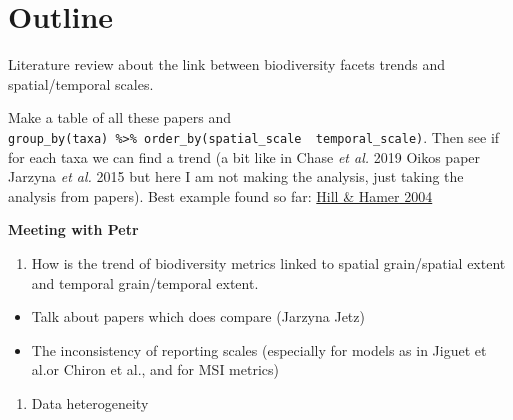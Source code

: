 \documentclass[
  12pt,
  oneside]{report}
\author{François Leroy, PhD student at CZU}
\date{2021-09-14}
\providecommand{\tightlist}{%
  \setlength{\itemsep}{0pt}\setlength{\parskip}{0pt}}
\begin{document}


\cleardoublepage 
{}

{
\hypersetup{linkcolor=}
\setcounter{tocdepth}{1}
\tableofcontents
\newpage
}
\vspace{50mm}


\cleardoublepage 
{}


\hypertarget{outline}{%
\chapter*{Outline}\label{outline}}

Literature review about the link between biodiversity facets trends and spatial/temporal scales.

Make a table of all these papers and \texttt{group\_by(taxa)\ \%\textgreater{}\%\ order\_by(spatial\_scale\ \textbar{}\ temporal\_scale)}. Then see if for each taxa we can find a trend (a bit like in Chase \emph{et al.} 2019 Oikos paper \textbar{} Jarzyna \emph{et al.} 2015 but here I am not making the analysis, just taking the analysis from papers). Best example found so far: \href{https://besjournals.onlinelibrary.wiley.com/doi/10.1111/j.0021-8901.2004.00926.x}{Hill \& Hamer 2004}

\textbf{Meeting with Petr}

\begin{enumerate}
\def\labelenumi{\arabic{enumi})}
\tightlist
\item
  How is the trend of biodiversity metrics linked to spatial grain/spatial extent and temporal grain/temporal extent.
\end{enumerate}

\begin{itemize}
\tightlist
\item
  Talk about papers which does compare (Jarzyna Jetz)
\item
  The inconsistency of reporting scales (especially for models as in Jiguet et al.or Chiron et al., and for MSI metrics)
\end{itemize}

\begin{enumerate}
\def\labelenumi{\arabic{enumi})}
\setcounter{enumi}{1}
\tightlist
\item
  Data heterogeneity
\end{enumerate}
\end{document}
